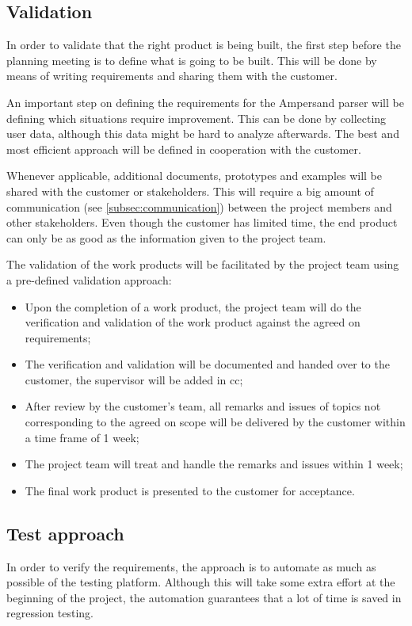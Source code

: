 \subsection{Validation}
In order to validate that the right product is being built, the first step before the planning meeting is to define what is going to be built.
This will be done by means of writing requirements and sharing them with the customer.

An important step on defining the requirements for the Ampersand parser will be defining which situations require improvement.
This can be done by collecting user data, although this data might be hard to analyze afterwards.
The best and most efficient approach will be defined in cooperation with the customer.

Whenever applicable, additional documents, prototypes and examples will be shared with the customer or stakeholders.
This will require a big amount of communication (see \autoref{subsec:communication}) between the project members and other stakeholders.
Even though the customer has limited time, the end product can only be as good as the information given to the project team.

The validation of the work products will be facilitated by the project team using a pre-defined validation approach:
\begin{itemize}
	\item Upon the completion of a work product, the project team will do the verification and validation of the work product against the agreed on requirements;
	\item The verification and validation will be documented and handed over to the customer, the supervisor will be added in cc;
	\item After review by the customer's team, all remarks and issues of topics not corresponding to the agreed on scope will be delivered by the customer within a time frame of 1 week;
	\item The project team will treat and handle the remarks and issues within 1 week;
	\item The final work product is presented to the customer for acceptance.
\end{itemize}

\subsection{Test approach}
In order to verify the requirements, the approach is to automate as much as possible of the testing platform.
Although this will take some extra effort at the beginning of the project, the automation guarantees that a lot of time is saved in regression testing.

